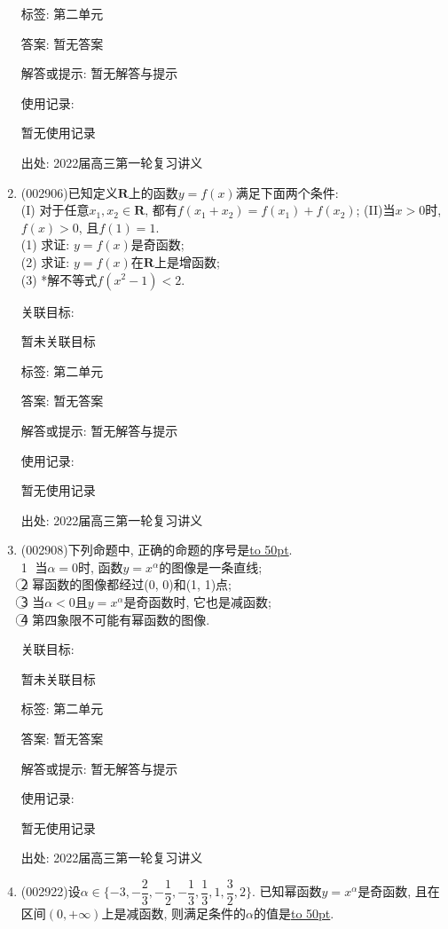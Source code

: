 \documentclass[10pt,a4paper]{article}
\newcommand{\blank}[1]{\underline{\hbox to #1pt{}}}
\begin{document}
\begin{enumerate}[1.]
标签: 第二单元

答案: 暂无答案

解答或提示: 暂无解答与提示

使用记录:

暂无使用记录


出处: 2022届高三第一轮复习讲义
\item { (002906)}已知定义$\mathbf{R}$上的函数$y=f(x)$满足下面两个条件:\\
(I) 对于任意$x_1,x_2\in \mathbf{R}$, 都有$f(x_1+x_2)=f(x_1)+f(x_2)$; (II)当$x>0$时, $f(x)>0$, 且$f(1)=1$.\\
(1) 求证: $y=f(x)$是奇函数;\\
(2) 求证: $y=f(x)$在$\mathbf{R}$上是增函数;\\
(3) *解不等式$f(x^2-1)<2$.


关联目标:

暂未关联目标



标签: 第二单元

答案: 暂无答案

解答或提示: 暂无解答与提示

使用记录:

暂无使用记录


出处: 2022届高三第一轮复习讲义
\item { (002908)}下列命题中, 正确的命题的序号是\blank{50}.\\
\textcircled{1} 当$\alpha =0$时, 函数$y={x^{\alpha }}$的图像是一条直线;\\
\textcircled{2} 幂函数的图像都经过(0, 0)和(1, 1)点;\\
\textcircled{3} 当$\alpha <0$且$y={x^{\alpha }}$是奇函数时, 它也是减函数;\\
\textcircled{4} 第四象限不可能有幂函数的图像.


关联目标:

暂未关联目标



标签: 第二单元

答案: 暂无答案

解答或提示: 暂无解答与提示

使用记录:

暂无使用记录


出处: 2022届高三第一轮复习讲义
\item { (002922)}设$\alpha \in \{-3,-\dfrac 23,-\dfrac 12,-\dfrac 13,\dfrac 13,1,\dfrac 32,2\}$. 已知幂函数$y=x^{\alpha}$是奇函数, 且在区间$(0,+\infty)$上是减函数, 则满足条件的$\alpha$的值是\blank{50}.



\end{enumerate}
\end{document}
